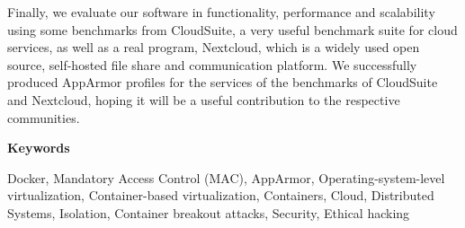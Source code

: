 Finally, we evaluate our software in functionality, performance and scalability using some benchmarks from CloudSuite, a very useful benchmark suite for cloud services, as well as a real program, Nextcloud, which is a widely used open source, self-hosted file share and communication platform. We successfully produced AppArmor profiles for the services of the benchmarks of CloudSuite and Nextcloud, hoping it will be a useful contribution to the respective communities.

\hfill\break
\begingroup
\Large{\textbf{Keywords}}
\endgroup

\hfill\break
Docker, Mandatory Access Control (MAC), AppArmor, Operating-system-level virtualization, Container-based virtualization, Containers, Cloud, Distributed Systems, Isolation, Container breakout attacks, Security, Ethical hacking

